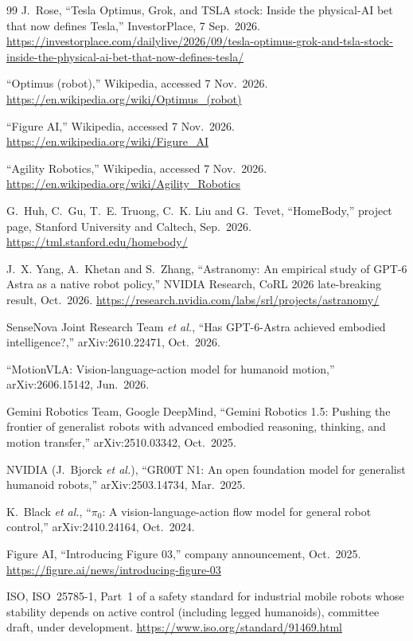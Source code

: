 \documentclass[11pt,a4paper]{article}
\begin{document}
\begin{thebibliography}{99}
J.~Rose, ``Tesla Optimus, Grok, and TSLA stock: Inside the physical-AI bet
that now defines Tesla,'' InvestorPlace, 7 Sep.\ 2026.
\url{https://investorplace.com/dailylive/2026/09/tesla-optimus-grok-and-tsla-stock-inside-the-physical-ai-bet-that-now-defines-tesla/}

``Optimus (robot),'' Wikipedia, accessed 7 Nov.\ 2026.
\url{https://en.wikipedia.org/wiki/Optimus_(robot)}

``Figure AI,'' Wikipedia, accessed 7 Nov.\ 2026.
\url{https://en.wikipedia.org/wiki/Figure_AI}

``Agility Robotics,'' Wikipedia, accessed 7 Nov.\ 2026.
\url{https://en.wikipedia.org/wiki/Agility_Robotics}

G.~Huh, C.~Gu, T.~E. Truong, C.~K. Liu and G.~Tevet, ``HomeBody,'' project
page, Stanford University and Caltech, Sep.\ 2026.
\url{https://tml.stanford.edu/homebody/}

J.~X. Yang, A.~Khetan and S.~Zhang, ``Astranomy: An empirical study of GPT-6
Astra as a native robot policy,'' NVIDIA Research, CoRL 2026 late-breaking
result, Oct.\ 2026.
\url{https://research.nvidia.com/labs/srl/projects/astranomy/}

SenseNova Joint Research Team \emph{et al.}, ``Has GPT-6-Astra achieved
embodied intelligence?,'' arXiv:2610.22471, Oct.\ 2026.

``MotionVLA: Vision-language-action model for humanoid motion,''
arXiv:2606.15142, Jun.\ 2026.

Gemini Robotics Team, Google DeepMind, ``Gemini Robotics 1.5: Pushing the
frontier of generalist robots with advanced embodied reasoning, thinking, and
motion transfer,'' arXiv:2510.03342, Oct.\ 2025.

NVIDIA (J.~Bjorck \emph{et al.}), ``GR00T N1: An open foundation model for
generalist humanoid robots,'' arXiv:2503.14734, Mar.\ 2025.

K.~Black \emph{et al.}, ``$\pi_0$: A vision-language-action flow model for
general robot control,'' arXiv:2410.24164, Oct.\ 2024.

Figure AI, ``Introducing Figure 03,'' company announcement, Oct.\ 2025.
\url{https://figure.ai/news/introducing-figure-03}

ISO, ISO~25785-1, Part~1 of a safety standard for industrial mobile robots
whose stability depends on active control (including legged humanoids),
committee draft, under development.
\url{https://www.iso.org/standard/91469.html}

\end{thebibliography}
\end{document}
